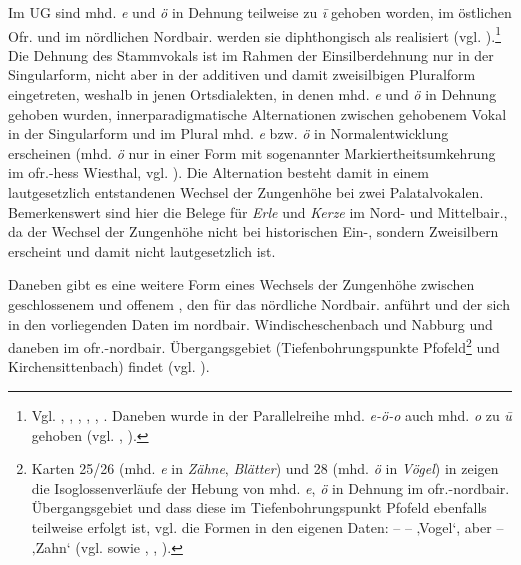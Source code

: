 \label{sec:7.1.2.1.3}\largerpage[2]
Im UG sind mhd. \textit{e} und \textit{ö} in Dehnung teilweise zu \textit{ī} gehoben worden, im östlichen Ofr. und im nördlichen Nordbair. werden sie diphthongisch als  realisiert (vgl. ).{\footnote{Vgl. \citet[Karte 3]{Gütter1971}, \citet[4d]{Kranzmayer1956}, \citet[73--74 und Karte 15]{Rowley1997}, \citet[121--125 und Karte 22]{Steger1968}, \citealt[75]{SMF3}, \citet[1110]{Wiesinger1983c}. Daneben wurde in der Parallelreihe mhd. \textit{e-ö-o} auch mhd. \textit{o} zu \textit{ū} gehoben (vgl. \citealt[Karte 4]{Gütter1971}, \citealt[73 und Karte 15]{Rowley1997}).}} Die Dehnung des Stammvokals ist im Rahmen der Einsilberdehnung nur in der Singularform, nicht aber in der additiven und damit zweisilbigen Pluralform eingetreten, weshalb in jenen Ortsdialekten, in denen mhd. \textit{e} und \textit{ö} in Dehnung gehoben wurden, innerparadigmatische Alternationen zwischen gehobenem Vokal in der Singularform und im Plural mhd. \textit{e} bzw. \textit{ö} in Normalentwicklung erscheinen (mhd. \textit{ö} nur in einer Form mit sogenannter Markiertheitsumkehrung im ofr.-hess Wiesthal, vgl. ).
Die Alternation besteht damit in einem lautgesetzlich entstandenen Wechsel der Zungenhöhe bei zwei Palatalvokalen. Bemerkenswert sind hier die Belege für \textit{Erle} und \textit{Kerze} im Nord- und Mittelbair., da der Wechsel der Zungenhöhe nicht bei historischen Ein-, sondern Zweisilbern erscheint und damit nicht lautgesetzlich ist.

Daneben gibt es eine weitere Form eines Wechsels der Zungenhöhe zwischen geschlossenem  und offenem , den \citet[116--117]{Rowley1997} für das nördliche Nordbair. anführt und der sich in den vorliegenden Daten im nordbair. Windischeschenbach und Nabburg und daneben im ofr.-nordbair. Übergangsgebiet (Tiefenbohrungspunkte Pfofeld\footnote{Karten 25/26 (mhd. \textit{e} in \textit{Zähne}, \textit{Blätter}) und 28 (mhd. \textit{ö} in \textit{Vögel}) in \citet{Kollmann1961} zeigen die Isoglossenverläufe der Hebung von mhd. \textit{e}, \textit{ö} in Dehnung im ofr.-nordbair. Übergangsgebiet und dass diese im Tiefenbohrungspunkt Pfofeld ebenfalls teilweise erfolgt ist, vgl. die Formen in den eigenen Daten:  --  --  ‚Vogel‘, aber  --  ‚Zahn‘ (vgl. \citealt[22--24]{Kollmann1961} sowie \citealt[Karte 33/34]{Brendel1962}, \citealt[§12 und Karte 3]{Kaußler1962}, \citealt[Karte 22]{Kopp1959}).} und Kirchensittenbach) findet (vgl. \citealt[§65]{Kollmer1985}).

